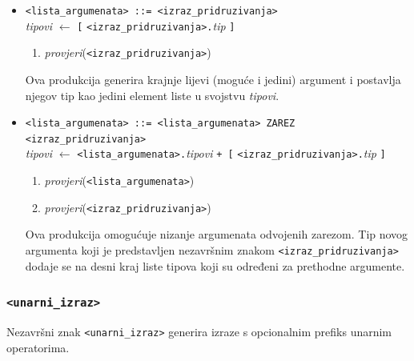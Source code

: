 \documentclass[times, 12pt, utf8]{book}
\begin{document}
\begin{itemize}

\item
\verb|<lista_argumenata> ::= <izraz_pridruzivanja>|\\
\emph{tipovi} \(\leftarrow\) \verb|[| \verb|<izraz_pridruzivanja>.|\emph{tip} \verb|]|
\begin{enumerate}
\item
\emph{provjeri}(\verb|<izraz_pridruzivanja>|)
\end{enumerate}

Ova produkcija generira krajnje lijevi (moguće i jedini) argument i postavlja njegov tip kao jedini element liste u svojstvu \emph{tipovi}.

\item
\verb|<lista_argumenata> ::= <lista_argumenata> ZAREZ <izraz_pridruzivanja>|\\
\emph{tipovi} \(\leftarrow\) \verb|<lista_argumenata>.|\emph{tipovi} \verb|+ [| \verb|<izraz_pridruzivanja>.|\emph{tip} \verb|]|
\begin{enumerate}
\item
\emph{provjeri}(\verb|<lista_argumenata>|)
\item
\emph{provjeri}(\verb|<izraz_pridruzivanja>|)
\end{enumerate}

Ova produkcija omogućuje nizanje argumenata odvojenih zarezom.
Tip novog argumenta koji je predstavljen nezavršnim znakom \verb|<izraz_pridruzivanja>| dodaje se na desni kraj liste tipova koji su određeni za prethodne argumente.

\end{itemize}

\subsubsection{\texttt{<unarni\_izraz>}}

Nezavršni znak \verb|<unarni_izraz>| generira izraze s opcionalnim prefiks unarnim operatorima.
\end{document}
